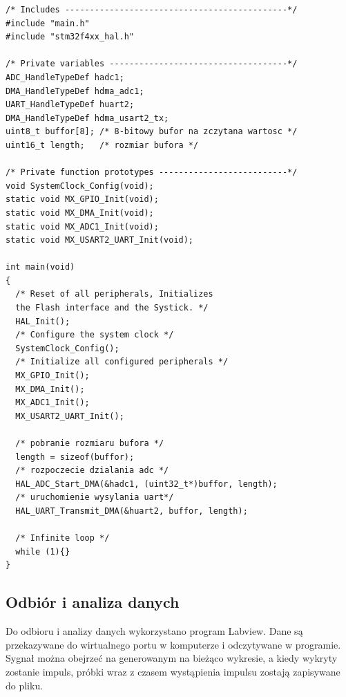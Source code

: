 \documentclass[12pt]{article}
\begin{document}
\newpage


\begin{lstlisting}
/* Includes ---------------------------------------------*/
#include "main.h"
#include "stm32f4xx_hal.h"

/* Private variables ------------------------------------*/
ADC_HandleTypeDef hadc1;
DMA_HandleTypeDef hdma_adc1;
UART_HandleTypeDef huart2;
DMA_HandleTypeDef hdma_usart2_tx;
uint8_t buffor[8]; /* 8-bitowy bufor na zczytana wartosc */
uint16_t length;   /* rozmiar bufora */

/* Private function prototypes --------------------------*/
void SystemClock_Config(void);
static void MX_GPIO_Init(void);
static void MX_DMA_Init(void);
static void MX_ADC1_Init(void);
static void MX_USART2_UART_Init(void);

int main(void)
{
  /* Reset of all peripherals, Initializes 
  the Flash interface and the Systick. */
  HAL_Init();
  /* Configure the system clock */
  SystemClock_Config();
  /* Initialize all configured peripherals */
  MX_GPIO_Init();
  MX_DMA_Init();
  MX_ADC1_Init();
  MX_USART2_UART_Init();
  
  /* pobranie rozmiaru bufora */
  length = sizeof(buffor); 
  /* rozpoczecie dzialania adc */
  HAL_ADC_Start_DMA(&hadc1, (uint32_t*)buffor, length);
  /* uruchomienie wysylania uart*/
  HAL_UART_Transmit_DMA(&huart2, buffor, length);

  /* Infinite loop */
  while (1){}
}
\end{lstlisting}

\newpage

\subsection{Odbiór i analiza danych}
Do odbioru i analizy danych wykorzystano program Labview. Dane są przekazywane do wirtualnego portu w komputerze i odczytywane w programie. Sygnał można obejrzeć na generowanym na bieżąco wykresie, a kiedy wykryty zostanie impuls, próbki wraz z czasem wystąpienia impulsu zostają zapisywane do pliku.
\end{document}
